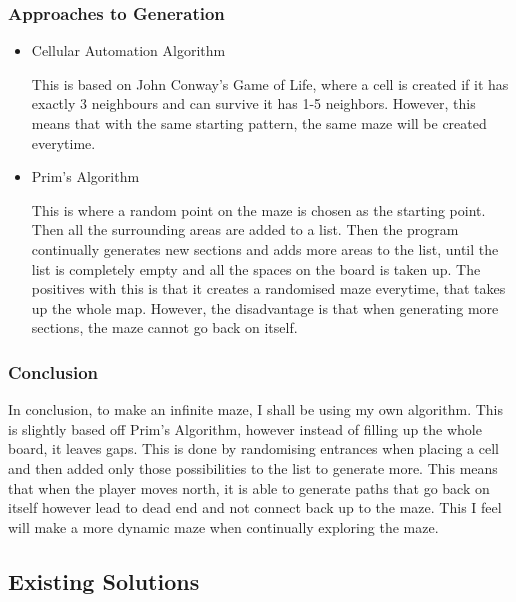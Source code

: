 \documentclass{article}
\begin{document}
            \subsubsection{Approaches to Generation}
                \begin{itemize}
                    \item Cellular Automation Algorithm

                    This is based on John Conway's Game of Life, where a cell is created if it has exactly 3 neighbours and can survive it has 1-5 neighbors. However, this means that with the same starting pattern, the same maze will be created everytime.

                    \item Prim's Algorithm

                    This is where a random point on the maze is chosen as the starting point. Then all the surrounding areas are added to a list. Then the program continually generates new sections and adds more areas to the list, until the list is completely empty and all the spaces on the board is taken up. The positives with this is that it creates a randomised maze everytime, that takes up the whole map. However, the disadvantage is that when generating more sections, the maze cannot go back on itself.
                \end{itemize}
            \subsubsection{Conclusion}
                In conclusion, to make an infinite maze, I shall be using my own algorithm. This is slightly based off Prim's Algorithm, however instead of filling up the whole board, it leaves gaps. This is done by randomising entrances when placing a cell and then added only those possibilities to the list to generate more. This means that when the player moves north, it is able to generate paths that go back on itself however lead to dead end and not connect back up to the maze. This I feel will make a more dynamic maze when continually exploring the maze.
        \clearpage
        \subsection{Existing Solutions} %
\end{document}
